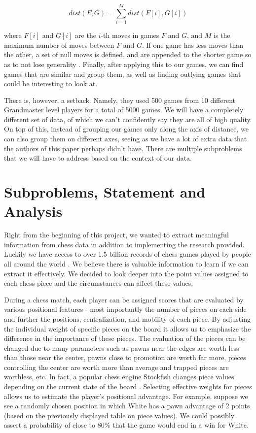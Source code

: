 \documentclass[12pt]{article}
\begin{document}
    \begin{equation}
        dist(F,G) = \sum_{i=1}^M dist(F[i], G[i])
    \end{equation}

    where $F[i]$ and $G[i]$ are the $i$-th moves in games $F$ and $G$, and $M$ is the maximum number of moves between $F$ and $G$. If one game has less moves than the other, a set of null moves is defined, and are appended to the shorter game so as to not lose generality \cite{main}. Finally, after applying this to our games, we can find games that are similar and group them, as well as finding outlying games that could be interesting to look at.

    There is, however, a setback. Namely, they used 500 games from 10 different Grandmaster level players for a total of 5000 games. We will have a completely different set of data, of which we can't confidently say they are all of high quality. On top of this, instead of grouping our games only along the axis of distance, we can also group them on different axes, seeing as we have a lot of extra data that the authors of this paper perhaps didn't have. There are multiple subproblems that we will have to address based on the context of our data.

    \section{Subproblems, Statement and Analysis}

    Right from the beginning of this project, we wanted to extract meaningful information from chess data in addition to implementing the research provided. Luckily we have access to over 1.5 billion records of chess games played by people all around the world \cite{lichessdb}. We believe there is valuable information to learn if we can extract it effectively. We decided to look deeper into the point values assigned to each chess piece and the circumstances can affect these values. 
    
    During a chess match, each player can be assigned scores that are evaluated by various positional features - most importantly the number of pieces on each side and further the positions, centralization, and mobility of each piece. By adjusting the individual weight of specific pieces on the board it allows us to emphasize the difference in the importance of these pieces. The evaluation of the pieces can be changed due to many parameters such as pawns near the edges are worth less than those near the center, pawns close to promotion are worth far more, pieces controlling the center are worth more than average and trapped pieces are worthless, etc. In fact, a popular chess engine Stockfish changes piece values depending on the current state of the board \cite{stockfish}. Selecting effective weights for pieces allows us to estimate the player's positional advantage. For example, suppose we see a randomly chosen position in which White has a pawn advantage of 2 points (based on the previously displayed table on piece values). We could possibly assert a probability of close to 80\% that the game would end in a win for White.
\end{document}
